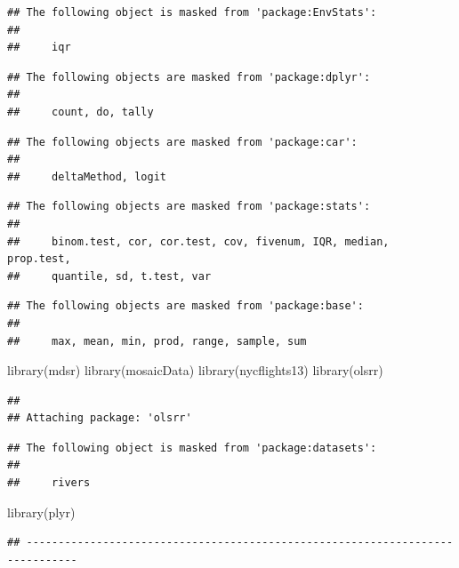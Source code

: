 \documentclass[
]{article}
\newenvironment{Shaded}{\begin{snugshade}}{\end{snugshade}}
\newcommand{\FunctionTok}[1]{\textcolor[rgb]{0.00,0.00,0.00}{#1}}
\newcommand{\NormalTok}[1]{#1}
\begin{document}
\begin{verbatim}
## The following object is masked from 'package:EnvStats':
## 
##     iqr
\end{verbatim}

\begin{verbatim}
## The following objects are masked from 'package:dplyr':
## 
##     count, do, tally
\end{verbatim}

\begin{verbatim}
## The following objects are masked from 'package:car':
## 
##     deltaMethod, logit
\end{verbatim}

\begin{verbatim}
## The following objects are masked from 'package:stats':
## 
##     binom.test, cor, cor.test, cov, fivenum, IQR, median, prop.test,
##     quantile, sd, t.test, var
\end{verbatim}

\begin{verbatim}
## The following objects are masked from 'package:base':
## 
##     max, mean, min, prod, range, sample, sum
\end{verbatim}

\begin{Shaded}
\begin{Highlighting}[]
\FunctionTok{library}\NormalTok{(mdsr)}
\FunctionTok{library}\NormalTok{(mosaicData)}
\FunctionTok{library}\NormalTok{(nycflights13)}
\FunctionTok{library}\NormalTok{(olsrr)}
\end{Highlighting}
\end{Shaded}

\begin{verbatim}
## 
## Attaching package: 'olsrr'
\end{verbatim}

\begin{verbatim}
## The following object is masked from 'package:datasets':
## 
##     rivers
\end{verbatim}

\begin{Shaded}
\begin{Highlighting}[]
\FunctionTok{library}\NormalTok{(plyr)}
\end{Highlighting}
\end{Shaded}

\begin{verbatim}
## ------------------------------------------------------------------------------
\end{verbatim}
\end{document}
